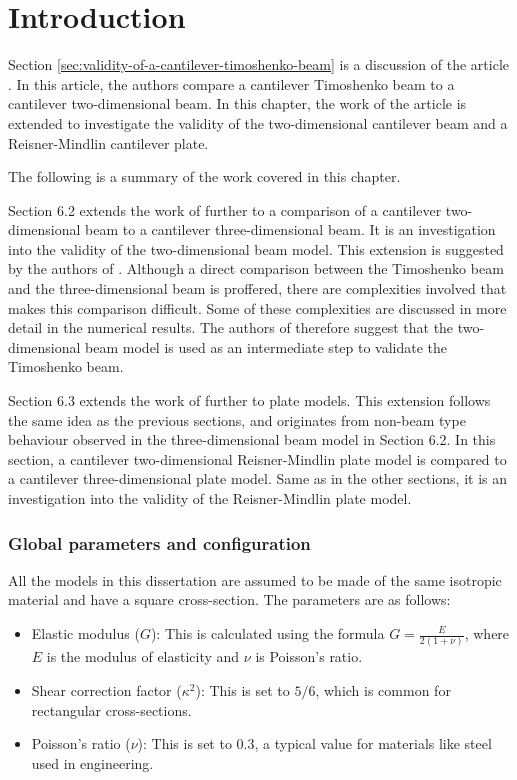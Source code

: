 \documentclass[../../main.tex]{subfiles}
\begin{document}
\section{Introduction}
Section \ref{sec:validity-of-a-cantilever-timoshenko-beam} is a discussion of the article \cite{LVV09}. In this article, the authors compare a cantilever Timoshenko beam to a cantilever two-dimensional beam. In this chapter, the work of the article is extended to investigate the validity of the two-dimensional cantilever beam and a Reisner-Mindlin cantilever plate.

The following is a summary of the work covered in this chapter.

Section 6.2 extends the work of \cite{LVV09} further to a comparison of a cantilever two-dimensional beam to a cantilever three-dimensional beam. It is an investigation into the validity of the two-dimensional beam model. This extension is suggested by the authors of \cite{LVV09}. Although a direct comparison between the Timoshenko beam and the three-dimensional beam is proffered, there are complexities involved that makes this comparison difficult. Some of these complexities are discussed in more detail in the numerical results. The authors of \cite{LVV09} therefore suggest that the two-dimensional beam model is used as an intermediate step to validate the Timoshenko beam.

Section 6.3 extends the work of \cite{LVV09} further to plate models. This extension follows the same idea as the previous sections, and originates from non-beam type behaviour observed in the three-dimensional beam model in Section 6.2. In this section, a cantilever two-dimensional Reisner-Mindlin plate model is compared to a cantilever three-dimensional plate model. Same as in the other sections, it is an investigation into the validity of the Reisner-Mindlin plate model. 

\subsubsection{Global parameters and configuration}
All the models in this dissertation are assumed to be made of the same isotropic material and have a square cross-section. The parameters are as follows:

\begin{itemize}
  \item Elastic modulus ($G$): This is calculated using the formula $G = \frac{E}{2(1+\nu)}$, where $E$ is the modulus of elasticity and $\nu$ is Poisson's ratio. 

  \item Shear correction factor ($\kappa^2$): This is set to $5/6$, which is common for rectangular cross-sections.

  \item Poisson's ratio ($\nu$): This is set to $0.3$, a typical value for materials like steel used in engineering.
\end{itemize}
\end{document}
